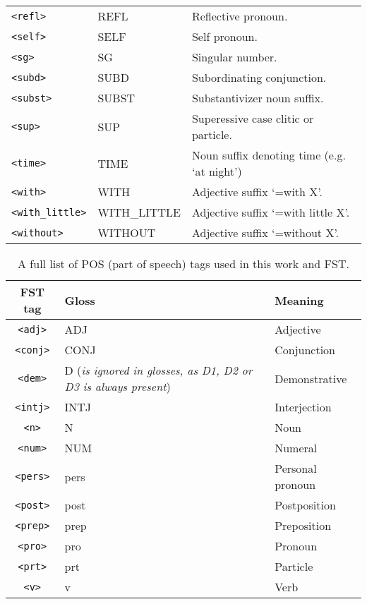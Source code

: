 \begin{table}[!h]
\begin{center}
\begin{tabular}{|p{4cm}|p{3cm}|p{8.5cm}|}
            \texttt{<refl>} & REFL & Reflective pronoun. \\
            \texttt{<self>} & SELF & Self pronoun. \\
            \texttt{<sg>} & SG & Singular number.\\
            \texttt{<subd>} & SUBD & Subordinating conjunction. \\
            \texttt{<subst>} & SUBST & Substantivizer noun suffix. \\
            \texttt{<sup>} & SUP & Superessive case clitic or particle.\\
            \texttt{<time>} & TIME & Noun suffix denoting time (e.g. `at night')\\
            \texttt{<with>} & WITH & Adjective suffix `=with X'.\\
            \texttt{<with\_little>} & WITH\_LITTLE & Adjective suffix `=with little X'.\\
            \texttt{<without>} & WITHOUT & Adjective suffix `=without X'.\\
            \hline
        \end{tabular}
    \end{center}
\end{table}

\begin{table}[!h]
    \begin{center}
        \caption{A full list of POS (part of speech) tags used in this work and FST.}
        \label{Tab:pos_tags}
        \begin{tabular}{|c|l|l|}
            \hline
            \textbf{FST tag} & \textbf{Gloss} & \textbf{Meaning} \\
            \hline
            \hline
            \texttt{<adj>} & ADJ & Adjective\\
            \texttt{<conj>} & CONJ & Conjunction\\
            \texttt{<dem>} & D (\textit{is ignored in glosses, as D1, D2 or D3 is always present}) & Demonstrative\\
            \texttt{<intj>} & INTJ & Interjection\\
            \texttt{<n>} & N & Noun\\
            \texttt{<num>} & NUM & Numeral\\
            \texttt{<pers>} & pers & Personal pronoun\\
            \texttt{<post>} & post & Postposition\\
            \texttt{<prep>} & prep & Preposition\\
            \texttt{<pro>} & pro & Pronoun\\
            \texttt{<prt>} & prt & Particle\\
            \texttt{<v>} & v & Verb\\
            \hline
        \end{tabular}
    \end{center}
\end{table}

\newpage